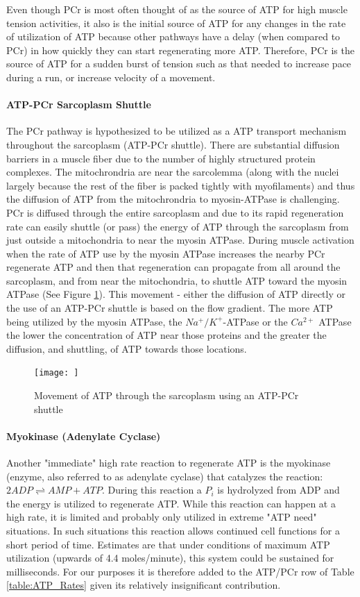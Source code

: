 Even though PCr is most often thought of as the source of ATP for high muscle tension activities, it also is the initial source of ATP for any changes in the rate of utilization of ATP because other pathways have a delay (when compared to PCr) in how quickly they can start regenerating more ATP. Therefore, PCr is the source of ATP for a sudden burst of tension such as that needed to increase pace during a run, or increase velocity of a movement.

\paragraph{ATP-PCr Sarcoplasm Shuttle}
The PCr pathway is hypothesized to be utilized as a ATP transport mechanism throughout the sarcoplasm (ATP-PCr shuttle). There are substantial diffusion barriers in a muscle fiber due to the number of highly structured protein complexes. The mitochrondria are near the sarcolemma (along with the nuclei largely because the rest of the fiber is packed tightly with myofilaments) and thus the diffusion of ATP from the mitochrondria to myosin-ATPase is challenging. PCr is diffused through the entire sarcoplasm and due to its rapid regeneration rate can easily shuttle (or pass) the energy of ATP through the sarcoplasm from just outside a mitochondria to near the myosin ATPase. During muscle activation when the rate of ATP use by the myosin ATPase increases the nearby PCr regenerate ATP and then that regeneration can propagate from all around the sarcoplasm, and from near the mitochondria, to shuttle ATP toward the myosin ATPase (See Figure \ref{fig:PCr}). This movement - either the diffusion of ATP directly or the use of an ATP-PCr shuttle is based on the flow gradient. The more ATP being utilized by the myosin ATPase, the $Na^+/K^+$-ATPase or the $Ca^{2+}$ ATPase the lower the concentration of ATP near those proteins and the greater the diffusion, and shuttling, of ATP towards those locations.

\begin{figure}[h!]
    \centering
    \texttt{[image: ]}
    \caption{Movement of ATP through the sarcoplasm using an ATP-PCr shuttle}
    \label{fig:PCr}
\end{figure}

\paragraph{Myokinase (Adenylate Cyclase)}

Another "immediate" high rate reaction to regenerate ATP is the myokinase (enzyme, also referred to as adenylate cyclase) that catalyzes the reaction: $2ADP \rightleftharpoons AMP + ATP$. During this reaction a $P_i$ is hydrolyzed from ADP and the energy is utilized to regenerate ATP. While this reaction can happen at a high rate, it is limited and probably only utilized in extreme "ATP need" situations. In such situations this reaction allows continued cell functions for a short period of time. Estimates are that under conditions of maximum ATP utilization (upwards of 4.4 moles/minute), this system could be sustained for milliseconds. For our purposes it is therefore added to the ATP/PCr row of Table \ref{table:ATP_Rates} given its relatively insignificant contribution.

